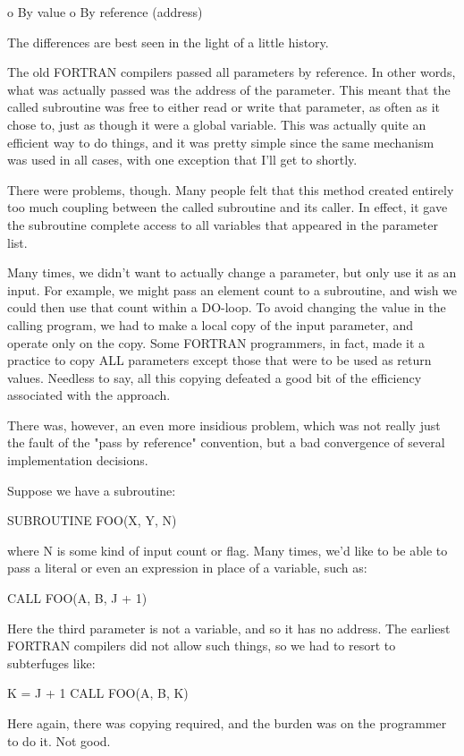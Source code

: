 \documentclass[float=false, crop=false]{standalone}
\begin{document}
     o By value
     o By reference (address)

The differences are best seen in the light of a little history.

The old FORTRAN compilers passed all parameters by reference. In other words,
what was actually passed was the address of the parameter. This meant that the
called subroutine was free to either read or write that parameter, as often as
it chose to, just as though it were a global variable. This was actually quite
an efficient way to do things, and it was pretty simple since the same mechanism
was used in all cases, with one exception that I'll get to shortly.

There were problems, though. Many people felt that this method created entirely
too much coupling between the called subroutine and its caller. In effect, it
gave the subroutine complete access to all variables that appeared in the
parameter list.

Many times, we didn't want to actually change a parameter, but only use it as an
input. For example, we might pass an element count to a subroutine, and wish we
could then use that count within a DO-loop. To avoid changing the value in the
calling program, we had to make a local copy of the input parameter, and operate
only on the copy. Some FORTRAN programmers, in fact, made it a practice to copy
ALL parameters except those that were to be used as return values. Needless to
say, all this copying defeated a good bit of the efficiency associated with the
approach.

There was, however, an even more insidious problem, which was not really just
the fault of the "pass by reference" convention, but a bad convergence of
several implementation decisions.

Suppose we have a subroutine:


     SUBROUTINE FOO(X, Y, N)


where N is some kind of input count or flag. Many times, we'd like to be able to
pass a literal or even an expression in place of a variable, such as:


     CALL FOO(A, B, J + 1)


Here the third parameter is not a variable, and so it has no address. The
earliest FORTRAN compilers did not allow such things, so we had to resort to
subterfuges like:


     K = J + 1
     CALL FOO(A, B, K)


Here again, there was copying required, and the burden was on the programmer to
do it. Not good.
\end{document}
